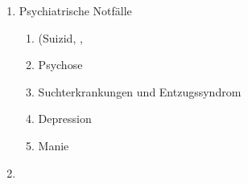\begin{enumerate}
\begin{enumerate}
\begin{enumerate}
      \end{enumerate}
      \item      Bauchtrauma
      \begin{enumerate}
        \item        offene, geschlossene Bauchverletzung \dotfill {},
        \item        Verletzung der Harn- und
        Geschlechtsorgane \dotfill {}
        \item        Beckentrauma \dotfill {}
      \end{enumerate}
      \item      Polytrauma (Definition, Prioritäten, Management) \dotfill {}
      \item      Wunden (mechanische, chemische, thermische) \dotfill {}
      \item      Dekubitus Prophylaxe und Lagerung bei Dekubitus \dotfill {}
      \item      Verbandlehre
      \dotfill
      ,
      \item      Akut auftretende Blutungen \dotfill {},
      ,
      \item      Vergiftung (Ursachen und Verdacht, Aufnahmearten) \dotfill {},
    \end{enumerate}
    \item Psychiatrische Notfälle
    \begin{enumerate}
      \item      (Suizid, \dotfill {}, 
      \item      Psychose  \dotfill {}
      \item      Suchterkrankungen und Entzugssyndrom  \dotfill {}
      \item      Depression  \dotfill {}
      \item      Manie  \dotfill {}
    \end{enumerate}
    \item

\end{enumerate}
